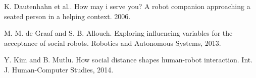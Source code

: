 \documentclass[paperwidth=118cm,paperheight=84cm,landscape,fontscale=0.2941]{baposter}
\begin{document}
\begin{poster}
{\vspace{1pt}
\noindent[3] K. Dautenhahn et al.. How may i serve you? A robot companion approaching a seated person in a helping context. 2006.

\vspace{1pt}
\noindent [4] M. M. de Graaf and S. B. Allouch. Exploring influencing variables for the acceptance of social robots. Robotics and Autonomous Systems, 2013.

\vspace{1pt}
\noindent [5] Y. Kim and B. Mutlu. How social distance shapes human-robot interaction. Int. J. Human-Computer Studies, 2014.\\

}



\end{poster}
\end{document}

